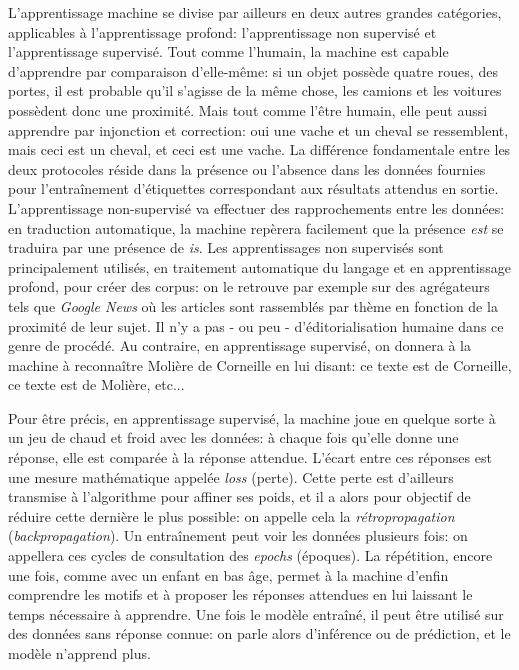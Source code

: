 L'apprentissage machine se divise par ailleurs en deux autres grandes catégories, applicables à l'apprentissage profond: l'apprentissage non supervisé et l'apprentissage supervisé. Tout comme l'humain, la machine est capable d'apprendre par comparaison d'elle-même: si un objet possède quatre roues, des portes, il est probable qu'il s'agisse de la même chose, les camions et les voitures possèdent donc une proximité. Mais tout comme l'être humain, elle peut aussi apprendre par injonction et correction: oui une vache et un cheval se ressemblent, mais ceci est un cheval, et ceci est une vache. La différence fondamentale entre les deux protocoles réside dans la présence ou l'absence dans les données fournies pour l'entraînement d'étiquettes correspondant aux résultats attendus en sortie. L'apprentissage non-supervisé va effectuer des rapprochements entre les données: en traduction automatique, la machine repèrera facilement que la présence \textit{est} se traduira par une présence de \textit{is}. Les apprentissages non supervisés sont principalement utilisés, en traitement automatique du langage et en apprentissage profond, pour créer des corpus: on le retrouve par exemple sur des agrégateurs tels que \textit{Google News} où les articles sont rassemblés par thème en fonction de la proximité de leur sujet. Il n'y a pas - ou peu - d'éditorialisation humaine dans ce genre de procédé. Au contraire, en apprentissage supervisé, on donnera à la machine à reconnaître Molière de Corneille en lui disant: ce texte est de Corneille, ce texte est de Molière, etc... 

Pour être précis, en apprentissage supervisé, la machine joue en quelque sorte à un jeu de chaud et froid avec les données: à chaque fois qu'elle donne une réponse, elle est comparée à la réponse attendue. L'écart entre ces réponses est une mesure mathématique appelée \textit{loss} (perte). Cette perte est d'ailleurs transmise à l'algorithme pour affiner ses poids, et il a alors pour objectif de réduire cette dernière le plus possible: on appelle cela la \textit{rétropropagation} (\textit{backpropagation}). Un entraînement peut voir les données plusieurs fois: on appellera ces cycles de consultation des \textit{epochs} (époques). La répétition, encore une fois, comme avec un enfant en bas âge, permet à la machine d'enfin comprendre les motifs et à proposer les réponses attendues en lui laissant le temps nécessaire à apprendre. Une fois le modèle entraîné, il peut être utilisé sur des données sans réponse connue: on parle alors d'inférence ou de prédiction, et le modèle n'apprend plus.


